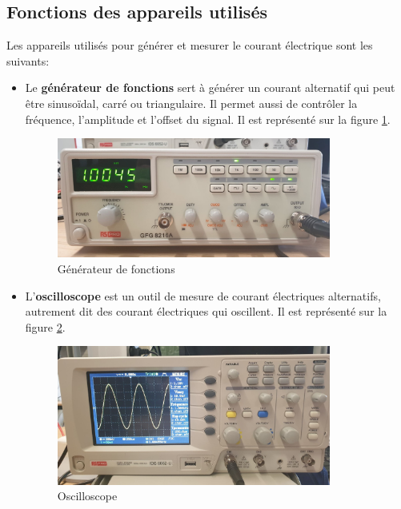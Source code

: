 \documentclass[a4paper]{article}
\begin{document}
\subsection{Fonctions des appareils utilisés}





Les appareils utilisés pour générer et mesurer le courant électrique sont les suivants:
\begin{itemize}



\item Le \textbf{générateur de fonctions} sert à générer un courant alternatif qui peut être sinusoïdal, carré ou triangulaire. Il permet aussi de contrôler la fréquence, l'amplitude et l'offset du signal. Il est représenté sur la figure \ref{fig:generateurFonction}.

\begin{figure}%
    \centering
    \includegraphics[width=0.85\textwidth]{generateur-fonction01.jpg}
    \caption{Générateur de fonctions}
    \label{fig:generateurFonction}
\end{figure}



\item L'\textbf{oscilloscope} est un outil de mesure de courant électriques alternatifs, autrement dit des courant électriques qui oscillent. Il est représenté sur la figure \ref{fig:oscilloscope}.

\begin{figure}%
    \centering
    \includegraphics[width=0.85\textwidth]{oscilloscope01.jpg}
    \caption{Oscilloscope}
    \label{fig:oscilloscope}
\end{figure}




\end{itemize}
\end{document}
